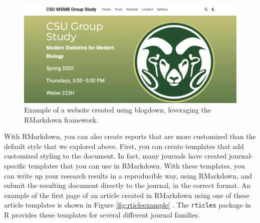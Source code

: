 \documentclass[]{tufte-book}
\begin{document}
\begin{figure}
\includegraphics[width=\textwidth]{figures/blogdownexample} \caption[Example of a website created using blogdown, leveraging the RMarkdown framework]{Example of a website created using blogdown, leveraging the RMarkdown framework.}\label{fig:blogdown}
\end{figure}

With RMarkdown, you can also create reports that are more customized than the
default style that we explored above. First, you can create templates that add
customized styling to the document. In fact, many journals have created
journal-specific templates that you can use in RMarkdown. With these templates,
you can write up your research results in a reproducible way, using RMarkdown,
and submit the resulting document directly to the journal, in the correct
format. An example of the first page of an article created in RMarkdown using
one of these article templates is shown in Figure \ref{fig:rticleexample}
\citep{wendt2022ten}. The \texttt{rticles} package in R provides these templates for several
different journal families.
\end{document}
